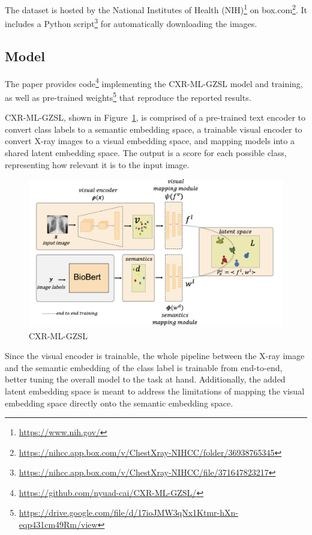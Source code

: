 \documentclass[letterpaper]{article} %
\begin{document}
The dataset is hosted by the National Institutes of Health (NIH)\footnote{\url{https://www.nih.gov/}} on box.com\footnote{\url{https://nihcc.app.box.com/v/ChestXray-NIHCC/folder/36938765345}}. It includes a Python script\footnote{\url{https://nihcc.app.box.com/v/ChestXray-NIHCC/file/371647823217}} for automatically downloading the images.

\subsection{Model}

The paper provides code\footnote{\url{https://github.com/nyuad-cai/CXR-ML-GZSL/}} implementing the CXR-ML-GZSL model and training, as well as pre-trained weights\footnote{\url{https://drive.google.com/file/d/17ioJMW3qNx1Ktmr-hXn-eqp431cm49Rm/view}} that reproduce the reported results. 

CXR-ML-GZSL, shown in Figure~\ref{fig:model}, is comprised of a pre-trained text encoder to convert class labels to a semantic embedding space, a trainable visual encoder to convert X-ray images to a visual embedding space, and mapping models into a shared latent embedding space. The output is a score for each possible class, representing how relevant it is to the input image.

\begin{figure}[h!]
\centering
\includegraphics[width=0.9\columnwidth]{model.png}
\caption{CXR-ML-GZSL \cite{hayat2021multilabel}}
\label{fig:model}
\end{figure}

Since the visual encoder is trainable, the whole pipeline between the X-ray image and the semantic embedding of the class label is trainable from end-to-end, better tuning the overall model to the task at hand. Additionally, the added latent embedding space is meant to address the limitations of mapping the visual embedding space directly onto the semantic embedding space.
\end{document}
